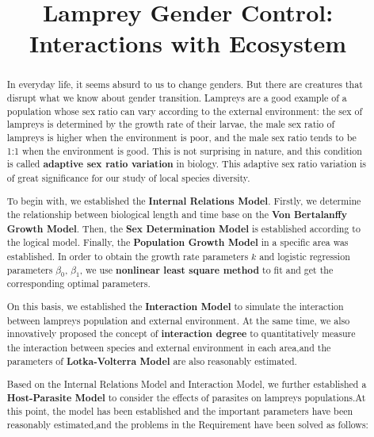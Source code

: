 \documentclass[12pt]{article}  %
\title{Lamprey Gender Control: Interactions with Ecosystem
}  %
\begin{document}
\begin{abstract}
  In everyday life, it seems absurd to us to change genders.  But there are creatures that disrupt what we know about gender transition.  Lampreys are a good example of a population whose sex ratio can vary according to the external environment: the sex of lampreys is determined by the growth rate of their larvae, the male sex ratio of lampreys is higher when the environment is poor, and the male sex ratio tends to be 1:1 when the environment is good.  This is not surprising in nature, and this condition is called \textbf{adaptive sex ratio variation} in biology.  This adaptive sex ratio variation is of great significance for our study of local species diversity.

	To begin with, we established the \textbf{Internal Relations Model}. Firstly, we determine the relationship between biological length and time base on the \textbf{Von Bertalanffy Growth Model}. Then, the \textbf{Sex Determination Model }is established according to the logical model. Finally, the \textbf{Population Growth Model} in a specific area was established.   In order to obtain the growth rate parameters $ k$ and logistic regression parameters $\beta_{0}$, $\beta_{1}$, we use \textbf{nonlinear least square method }to fit and get the corresponding optimal parameters.

On this basis, we established the \textbf{Interaction Model} to simulate the interaction between lampreys population and external environment. At the same time, we also innovatively proposed the concept of \textbf{interaction degree} to quantitatively measure the interaction between species and external environment in each area,and the parameters of\textbf{ Lotka-Volterra Model} are also reasonably estimated.

Based on the Internal Relations Model and Interaction Model, we further established a \textbf{Host-Parasite Model} to consider the effects of parasites on lampreys populations.At this point, the model has been established and the important parameters have been reasonably estimated,and the problems in the Requirement have been solved as follows:



\end{abstract}
\end{document}
